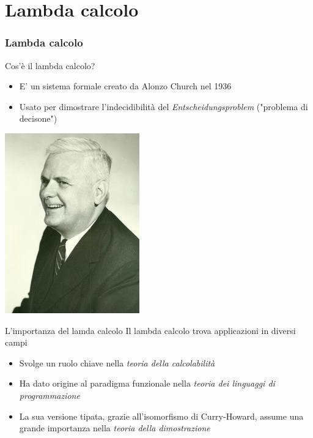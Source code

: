 \documentclass{beamer}
\newcommand{\makepart}[1]{ %
\part{#1} \frame{\partpage}
}
\begin{document}
\makepart{Lambda calcolo}
\section{Lambda calcolo}

\begin{frame}{Cos'è il lambda calcolo?}
\begin{itemize}
  \item E' un sistema formale creato da Alonzo Church nel 1936
  \item Usato per dimostrare l'indecidibilità del \textit{Entscheidungsproblem}
    ("problema di decisone")
\end{itemize}
\begin{center}
  \includegraphics[scale=0.70]{8.jpg}
\end{center}
\end{frame}

\begin{frame}{L'importanza del lamda calcolo}
Il lambda calcolo trova applicazioni in diversi campi 
\begin{itemize}
  \item Svolge un ruolo chiave nella \textit{teoria della calcolabilità} 
  \item Ha dato origine al paradigma funzionale nella \textit{teoria dei linguaggi
        di programmazione}
  \item La sua versione tipata, grazie all'isomorfismo di Curry-Howard, assume
        una grande importanza nella \textit{teoria della dimostrazione}
\end{itemize}
\end{frame}
\end{document}
